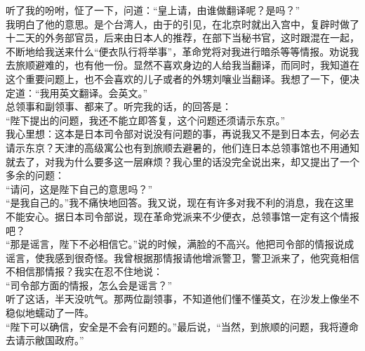 听了我的吩咐，怔了一下，问道：“皇上请，由谁做翻译呢？是吗？”\\

我明白了他的意思。是个台湾人，由于的引见，在北京时就出入宫中，复辟时做了十二天的外务部官员，后来由日本人的推荐，在部下当秘书官，这时跟混在一起，不断地给我送来什么“便衣队行将举事”，革命党将对我进行暗杀等等情报。劝说我去旅顺避难的，也有他一份。显然不喜欢身边的人给我当翻译，而同时，我知道在这个重要问题上，也不会喜欢的儿子或者的外甥刘嚷业当翻译。我想了一下，便决定道：“我用英文翻译。会英文。”\\

总领事和副领事、都来了。听完我的话，的回答是：\\

“陛下提出的问题，我还不能立即答复，这个问题还须请示东京。”\\

我心里想：这本是日本司令部对说没有问题的事，再说我又不是到日本去，何必去请示东京？天津的高级寓公也有到旅顺去避暑的，他们连日本总领事馆也不用通知就去了，对我为什么要多这一层麻烦？我心里的话没完全说出来，却又提出了一个多余的问题：\\

“请问，这是陛下自己的意思吗？”\\

“是我自己的。”我不痛快地回答。我又说，现在有许多对我不利的消息，我在这里不能安心。据日本司令部说，现在革命党派来不少便衣，总领事馆一定有这个情报吧？\\

“那是谣言，陛下不必相信它。”说的时候，满脸的不高兴。他把司令部的情报说成谣言，使我感到很奇怪。我曾根据那情报请他增派警卫，警卫派来了，他究竟相信不相信那情报？我实在忍不住地说：\\

“司令部方面的情报，怎么会是谣言？”\\

听了这话，半天没吭气。那两位副领事，不知道他们懂不懂英文，在沙发上像坐不稳似地蠕动了一阵。\\

“陛下可以确信，安全是不会有问题的。”最后说，“当然，到旅顺的问题，我将遵命去请示敝国政府。”\\

